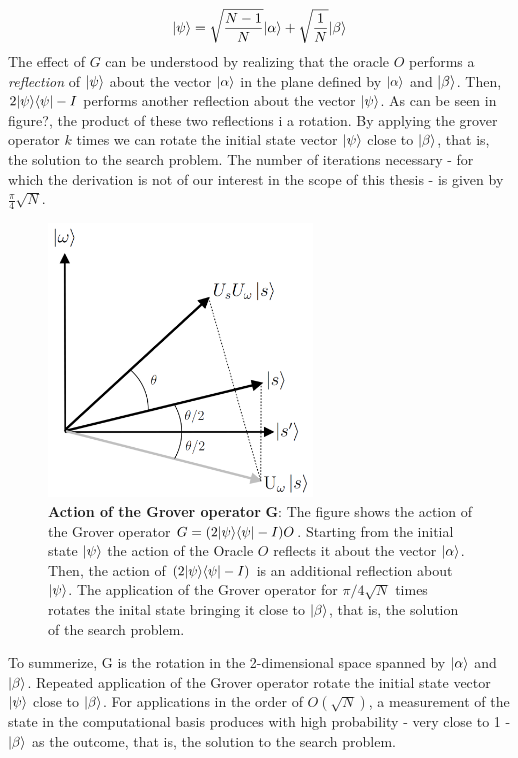 \begin{equation}
  {|{\psi}\rangle}= \sqrt{\frac{N-1}{N}}{|{\alpha}\rangle} + \sqrt{\frac{1}{N}}{|{\beta}\rangle}
\end{equation}
The effect of $G$ can be understood by realizing that the oracle $O$ performs a \textit{reflection} of ${|{\psi}\rangle}$ about the vector ${|{\alpha}\rangle}$ in the plane defined by ${|{\alpha}\rangle}$ and ${|{\beta}\rangle}$. Then, $2{|{\psi}\rangle}{\langle{\psi}|}-I$ performs another reflection about the vector ${|{\psi}\rangle}$. As can be seen in figure?, the product of these two reflections i a rotation. By applying the grover operator $k$ times we can rotate the initial state vector ${|{\psi}\rangle}$ close to ${|{\beta}\rangle}$, that is, the solution to the search problem. The number of iterations necessary - for which the derivation is not of our interest in the scope of this thesis - is given by $\frac{\pi}{4}\sqrt{N}$.
\begin{figure}[ht]
  \centering
  \includegraphics[width=70mm]{figures/chapter1/grover_reflection}
  \caption[Action of the Grover operator]{\textbf{Action of the Grover operator }$\bm{G}$: The figure shows the action of the Grover operator $G=(2{|{\psi}\rangle}{\langle{\psi}|} -I)O$. Starting from the initial state ${|{\psi}\rangle}$ the action of the Oracle $O$ reflects it about the vector ${|{\alpha}\rangle}$. Then, the action of $(2{|{\psi}\rangle}{\langle{\psi}|}-I)$ is an additional reflection about ${|{\psi}\rangle}$. The application of the Grover operator for $\pi/4\sqrt{N}$ times rotates the inital state bringing it close to ${|{\beta}\rangle}$, that is, the solution of the search problem.}
  \label{fig:grover_operator}
\end{figure}


\noindent
To summerize, G is the rotation in the 2-dimensional space spanned by ${|{\alpha}\rangle}$ and ${|{\beta}\rangle}$. Repeated application of the Grover operator rotate the initial state vector ${|{\psi}\rangle}$ close to ${|{\beta}\rangle}$. For applications in the order of $O(\sqrt{N})$, a measurement of the state in the computational basis produces with high probability - very close to 1 - ${|{\beta}\rangle}$ as the outcome, that is, the solution to the search problem.


